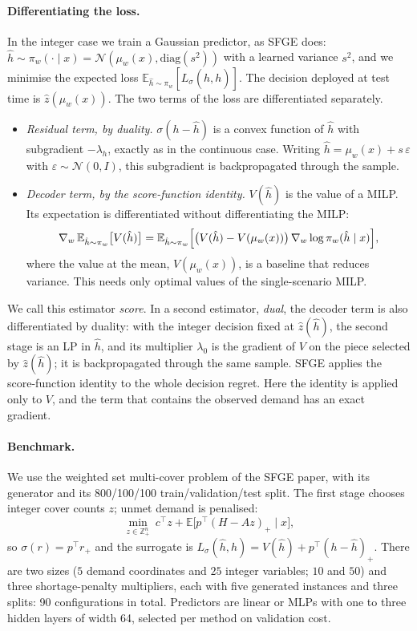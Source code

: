 \documentclass[11pt,a4paper]{article}
\theoremstyle{remark}
\newcommand{\E}{\mathbb E}
\newcommand{\hh}{\hat h}
\newcommand{\Ls}{L_\sigma}
\begin{document}
\paragraph{Differentiating the loss.}
In the integer case we train a Gaussian predictor, as SFGE does:
$\hh\sim\pi_w(\cdot\mid x)=\mathcal N(\mu_w(x),\mathrm{diag}(s^2))$ with a
learned variance $s^2$, and we minimise the expected loss
$\E_{\hh\sim\pi_w}[\Ls(\hh,h)]$. The decision deployed at test time is
$\hat z(\mu_w(x))$. The two terms of the loss are differentiated separately.
\begin{itemize}
\item \emph{Residual term, by duality.} $\sigma(h-\hh)$ is a convex function of
      $\hh$ with subgradient $-\lambda_h$, exactly as in the continuous case.
      Writing $\hh=\mu_w(x)+s\,\varepsilon$ with $\varepsilon\sim\mathcal N(0,I)$,
      this subgradient is backpropagated through the sample.
\item \emph{Decoder term, by the score-function identity.} $V(\hh)$ is the
      value of a MILP. Its expectation is differentiated without
      differentiating the MILP:
      \[
       \nabla_w\,\E_{\hh\sim\pi_w}\bigl[V(\hh)\bigr]
       =\E_{\hh\sim\pi_w}\Bigl[\bigl(V(\hh)-V(\mu_w(x))\bigr)\,
         \nabla_w\log\pi_w(\hh\mid x)\Bigr],
      \]
      where the value at the mean, $V(\mu_w(x))$, is a baseline that reduces
      variance. This needs only optimal values of the single-scenario MILP.
\end{itemize}
We call this estimator \emph{score}. In a second estimator, \emph{dual}, the
decoder term is also differentiated by duality: with the integer decision fixed
at $\hat z(\hh)$, the second stage is an LP in $\hh$, and its multiplier
$\lambda_0$ is the gradient of $V$ on the piece selected by $\hat z(\hh)$; it
is backpropagated through the same sample. SFGE applies the score-function
identity to the whole decision regret. Here the identity is applied only to
$V$, and the term that contains the observed demand has an exact gradient.

\paragraph{Benchmark.}
We use the weighted set multi-cover problem of the SFGE paper, with its
generator and its 800/100/100 train/validation/test split. The first stage
chooses integer cover counts $z$; unmet demand is penalised:
\[
 \min_{z\in\mathbb Z_+^{n}}\ c^\top z+\E\bigl[p^\top(H-Az)_+\mid x\bigr],
\]
so $\sigma(r)=p^\top r_+$ and the surrogate is
$\Ls(\hh,h)=V(\hh)+p^\top(h-\hh)_+$. There are two sizes ($5$ demand
coordinates and $25$ integer variables; $10$ and $50$) and three shortage-penalty
multipliers, each with five generated instances and three splits: 90
configurations in total. Predictors are linear or MLPs with one to three hidden
layers of width 64, selected per method on validation cost.
\end{document}
